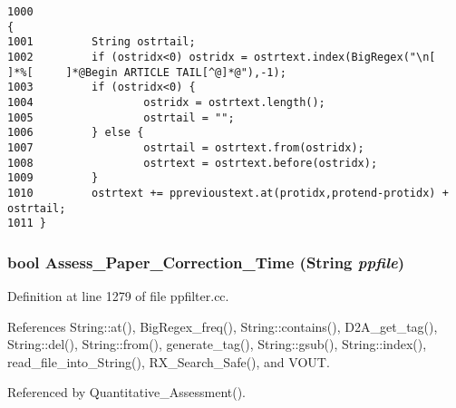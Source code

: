 \footnotesize\begin{verbatim}1000                                                                                                           {
1001         String ostrtail;
1002         if (ostridx<0) ostridx = ostrtext.index(BigRegex("\n[  ]*%[     ]*@Begin ARTICLE TAIL[^@]*@"),-1);
1003         if (ostridx<0) {
1004                 ostridx = ostrtext.length();
1005                 ostrtail = "";
1006         } else {
1007                 ostrtail = ostrtext.from(ostridx);
1008                 ostrtext = ostrtext.before(ostridx);
1009         }
1010         ostrtext += pprevioustext.at(protidx,protend-protidx) + ostrtail;
1011 }
\end{verbatim}\normalsize 
{}
\subsubsection{\setlength{\rightskip}{0pt plus 5cm}bool Assess\_\-Paper\_\-Correction\_\-Time ({\bf String} {\em ppfile})}\label{ppfilter_8cc_a30}




Definition at line 1279 of file ppfilter.cc.

References String::at(), Big\-Regex\_\-freq(), String::contains(), D2A\_\-get\_\-tag(), String::del(), String::from(), generate\_\-tag(), String::gsub(), String::index(), read\_\-file\_\-into\_\-String(), RX\_\-Search\_\-Safe(), and VOUT.

Referenced by Quantitative\_\-Assessment().



